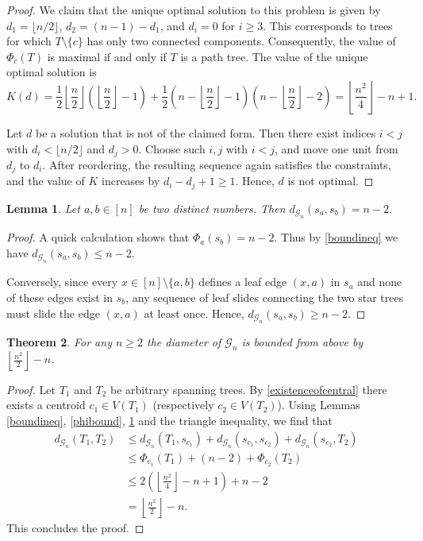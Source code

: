 \documentclass[reqno,dvipsnames]{amsart}
\newtheorem{theorem}{Theorem}[section]
\theoremstyle{plain}
\newtheorem{lemma}[theorem]{Lemma}
\numberwithin{equation}{section}
\theoremstyle{definition}
\begin{document}
\begin{proof}
	We claim that the unique optimal solution to this problem is given by $d_1 = \lfloor n/2 \rfloor$, $d_2 = (n-1)- d_1$, and $d_i = 0$ for $i\geq 3$. This corresponds to trees for which $T\setminus \{c\}$ has only two connected components. Consequently, the value of $\Phi_c(T)$ is maximal if and only if $T$ is a path tree. The value of the unique optimal solution is 
	\[
	K(d) = \frac{1}{2}\left\lfloor \frac{n}{2} \right\rfloor\left( \left\lfloor \frac{n}{2} \right\rfloor -1 \right) +\frac{1}{2} \left(n- \left\lfloor \frac{n}{2} \right\rfloor-1\right) \left(n-\left\lfloor \frac{n}{2} \right\rfloor -2\right)  = \left\lfloor\frac{n^2}{4}\right\rfloor -n+1.
	\]

	Let $d$ be a solution that is not of the claimed form. Then there exist indices $i<j$ with $d_i<\lfloor n/2\rfloor$ and $d_j>0$. Choose such $i,j$ with $i<j$, and move one unit from $d_j$ to $d_i$. After reordering, the resulting sequence again satisfies the constraints, and the value of $K$ increases by $d_i-d_j+1\geq 1$. Hence, $d$ is not optimal.
\end{proof}

\begin{lemma}\label{stardist}
	Let $a,b\in [n]$ be two distinct numbers. Then $d_{\mathcal{G}_n}(s_a,s_b) = n-2$.
\end{lemma}

\begin{proof}
	A quick calculation shows that $\Phi_{a}(s_b) = n-2$. Thus by \autoref{boundineq} we have $d_{\mathcal{G}_n}(s_a,s_b) \leq n-2$.

	Conversely, since every $x\in [n]\setminus\{a,b\}$ defines a leaf edge $(x,a)$ in $s_a$ and none of these edges exist in $s_b$, any sequence of leaf slides connecting the two star trees must slide the edge $(x,a)$ at least once. Hence, $d_{\mathcal{G}_n}(s_a,s_b) \geq n-2$.
\end{proof}

\begin{theorem}
	\label{upper diam bound}
	For any $n\geq2$ the diameter of $\mathcal{G}_n$ is bounded from above by $\left\lfloor \frac{n^2}{2}\right\rfloor -n$.
\end{theorem}

\begin{proof}
	Let $T_1$ and $T_2$ be arbitrary spanning trees. By \autoref{existenceofcentral} there exists a centroid $c_1\in V(T_1)$ (respectively $c_2\in V(T_2)$). Using Lemmas \ref{boundineq}, \ref{phibound}, \ref{stardist} and the triangle inequality, we find that
	\[
	\begin{split}
		d_{\mathcal{G}_n}(T_1,T_2)	&\leq d_{\mathcal{G}_n}(T_1,s_{c_1}) + d_{\mathcal{G}_n}(s_{c_1},s_{c_2}) + d_{\mathcal{G}_n}(s_{c_2},T_2)\\
		&\leq \Phi_{c_1}(T_1) + (n-2) + \Phi_{c_2}(T_2)\\
		&\leq 2\left(\left\lfloor \frac{n^2}{4}\right\rfloor-n+1\right)+ n-2\\
		&= \left\lfloor \frac{n^2}{2}\right\rfloor -n.
	\end{split}
	\] 
	This concludes the proof.
\end{proof}
\end{document}

